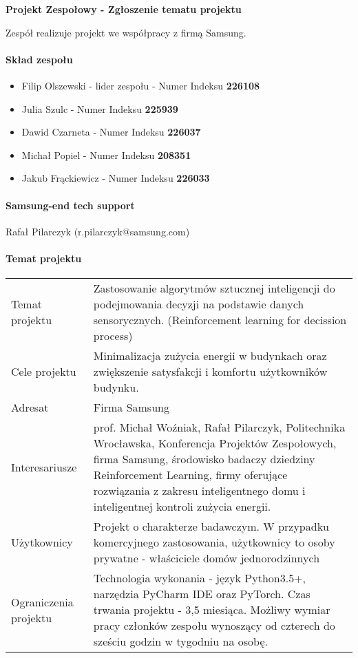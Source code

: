 \documentclass{article}
\begin{document}
\begin{center}
\textbf{Projekt Zespołowy - Zgłoszenie tematu projektu}
\end{center}

Zespół realizuje projekt we współpracy z firmą Samsung.

\paragraph{Skład zespołu}
\begin{itemize}
\item Filip Olszewski - lider zespołu - Numer Indeksu \textbf{226108}
\item Julia Szulc - Numer Indeksu \textbf{225939}
\item Dawid Czarneta - Numer Indeksu \textbf{226037}
\item Michał Popiel - Numer Indeksu \textbf{208351}
\item Jakub Frąckiewicz - Numer Indeksu \textbf{226033}
\end{itemize}
\paragraph{Samsung-end tech support}
Rafał Pilarczyk (r.pilarczyk@samsung.com)
\paragraph{Temat projektu}

\begin{center}
{\def\arraystretch{1.5}\tabcolsep=6pt
	\begin{tabular}{l p{10cm}} 
	Temat projektu& Zastosowanie algorytmów sztucznej inteligencji do podejmowania decyzji na podstawie danych sensorycznych. (Reinforcement learning for decission process)\\
	Cele projektu& Minimalizacja zużycia energii w budynkach oraz zwiększenie satysfakcji i komfortu użytkowników budynku. \\
	Adresat& Firma Samsung\\
	Interesariusze& prof. Michał Woźniak, Rafał Pilarczyk, Politechnika Wrocławska, Konferencja Projektów Zespołowych, firma Samsung, środowisko badaczy dziedziny Reinforcement Learning, firmy oferujące rozwiązania z zakresu inteligentnego domu i inteligentnej kontroli zużycia energii.\\
	Użytkownicy& Projekt o charakterze badawczym. W przypadku komercyjnego zastosowania, użytkownicy to osoby prywatne - właściciele domów jednorodzinnych\\
	Ograniczenia projektu&Technologia wykonania - język Python3.5+, narzędzia PyCharm IDE oraz PyTorch. Czas trwania projektu - 3,5 miesiąca. Możliwy wymiar pracy członków zespołu wynoszący od czterech do sześciu godzin w tygodniu na osobę.\\

\end{tabular}}
\end{center}
\end{document}
